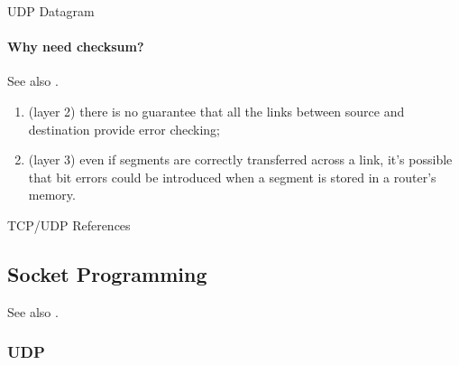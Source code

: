 \begin{frame}{UDP Datagram}
  \begin{center}
  \end{center}
  \label{fig:udp-datagram-format}
\end{frame}

\paragraph{Why need checksum?}

  See also .
  \begin{enumerate}
  \item (layer 2) there is no guarantee that all the links between source and destination
    provide error checking;
  \item (layer 3) even if segments are correctly transferred across a link, it's possible
    that bit errors could be introduced when a segment is stored in a router's memory.
  \end{enumerate}

\begin{frame}{TCP/UDP References}
  \begin{refsection}
    \nocite{wiki:tcp, wiki:udp, wiki:checksum, rfc793, rfc768}
    \printbibliography[heading=none]
  \end{refsection}
\end{frame}

\subsection{Socket Programming}

See also .

\subsubsection{UDP}

